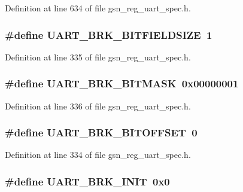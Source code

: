 Definition at line 634 of file gsn\_\-reg\_\-uart\_\-spec.h.

\hypertarget{a00575_a16232bfa6ebba3f5429f46b8785cdeb5}{
\subsubsection[{UART\_\-BRK\_\-BITFIELDSIZE}]{\setlength{\rightskip}{0pt plus 5cm}\#define UART\_\-BRK\_\-BITFIELDSIZE~1}}
\label{a00575_a16232bfa6ebba3f5429f46b8785cdeb5}


Definition at line 335 of file gsn\_\-reg\_\-uart\_\-spec.h.

\hypertarget{a00575_a49a01aea3caefdd66c6884d2d2213af4}{
\subsubsection[{UART\_\-BRK\_\-BITMASK}]{\setlength{\rightskip}{0pt plus 5cm}\#define UART\_\-BRK\_\-BITMASK~0x00000001}}
\label{a00575_a49a01aea3caefdd66c6884d2d2213af4}


Definition at line 336 of file gsn\_\-reg\_\-uart\_\-spec.h.

\hypertarget{a00575_a00bd1977495e8221b270da43c8da199f}{
\subsubsection[{UART\_\-BRK\_\-BITOFFSET}]{\setlength{\rightskip}{0pt plus 5cm}\#define UART\_\-BRK\_\-BITOFFSET~0}}
\label{a00575_a00bd1977495e8221b270da43c8da199f}


Definition at line 334 of file gsn\_\-reg\_\-uart\_\-spec.h.

\hypertarget{a00575_a5e3f83ced3ce71f83715834f6525864d}{
\subsubsection[{UART\_\-BRK\_\-INIT}]{\setlength{\rightskip}{0pt plus 5cm}\#define UART\_\-BRK\_\-INIT~0x0}}
\label{a00575_a5e3f83ced3ce71f83715834f6525864d}


